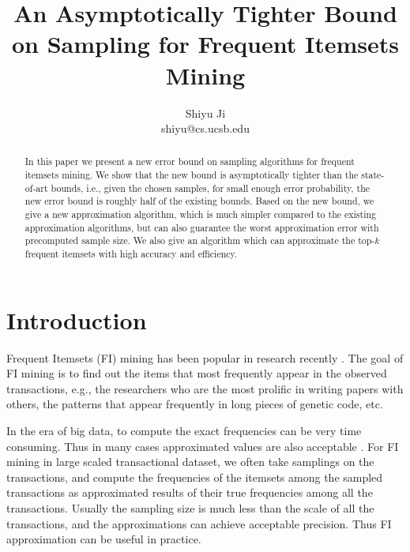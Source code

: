 \documentclass{article}
\begin{document}
\title{\Large\bf An Asymptotically Tighter Bound on Sampling for Frequent Itemsets Mining}
\author{Shiyu Ji\\ shiyu@cs.ucsb.edu}
\date{}
\maketitle

\newtheorem{definition}{Definition}
\theoremstyle{definition}
\newtheorem{theorem}{Theorem}
\theoremstyle{plain}
\newtheorem{lemma}{Lemma}
\theoremstyle{plain}
\newtheorem{corollary}{Corollary}
\theoremstyle{plain}

\begin{abstract}
In this paper we present a new error bound on sampling algorithms for frequent itemsets mining. We show that the new bound is asymptotically tighter than the state-of-art bounds, i.e., given the chosen samples, for small enough error probability, the new error bound is roughly half of the existing bounds. Based on the new bound, we give a new approximation algorithm, which is much simpler compared to the existing approximation algorithms, but can also guarantee the worst approximation error with precomputed sample size. We also give an algorithm which can approximate the top-$k$ frequent itemsets with high accuracy and efficiency.
\end{abstract}

\section{Introduction}
Frequent Itemsets (FI) mining has been popular in research recently \cite{AIS93, HCX07, RU15}. The goal of FI mining is to find out the items that most frequently appear in the observed transactions, e.g., the researchers who are the most prolific in writing papers with others, the patterns that appear frequently in long pieces of genetic code, etc. 

In the era of big data, to compute the exact frequencies can be very time consuming. Thus in many cases approximated values are also acceptable \cite{RU15}.
For FI mining in large scaled transactional dataset, we often take samplings on the transactions, and compute the frequencies of the itemsets among the sampled transactions as approximated results of their true frequencies among all the transactions. Usually the sampling size is much less than the scale of all the transactions, and the approximations can achieve acceptable precision. Thus FI approximation can be useful in practice.
\end{document}
